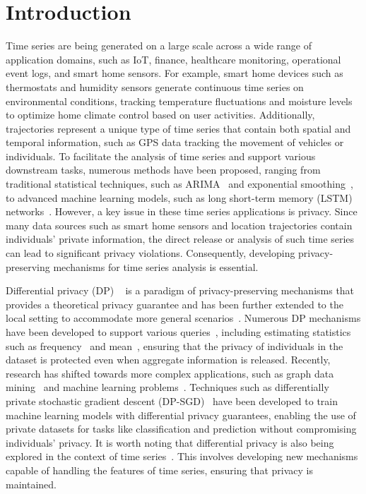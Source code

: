 \section{Introduction}
Time series are being generated on a large scale across a wide range of application domains, such as IoT, finance, healthcare monitoring, operational event logs, and smart home sensors. For example, smart home devices such as thermostats and humidity sensors generate continuous time series on environmental conditions, tracking temperature fluctuations and moisture levels to optimize home climate control based on user activities. Additionally, trajectories represent a unique type of time series that contain both spatial and temporal information, such as GPS data tracking the movement of vehicles or individuals. To facilitate the analysis of time series and support various downstream tasks,  numerous methods have been proposed, ranging from traditional statistical techniques, such as ARIMA~\cite{hyndman2018forecasting} and exponential smoothing~\cite{gardner2006exponential}, to advanced machine learning models, such as long short-term memory (LSTM) networks~\cite{shi2015convolutional}. However, a key issue in these time series applications is privacy. Since many data sources such as smart home sensors and location trajectories contain individuals' private information, the direct release or analysis of such time series can lead to significant privacy violations. Consequently, developing privacy-preserving mechanisms for time series analysis is essential.

Differential privacy (DP) ~\cite{Dwork2006} is a paradigm of privacy-preserving mechanisms that provides a theoretical privacy guarantee and has been further extended to the local setting to accommodate more general scenarios~\cite{ye2020local, Yang2023}. Numerous DP mechanisms have been developed to support various queries~\cite{wang2017locally, wang2018privacy, wang2019locallyhv}, including estimating statistics such as frequency~\cite{wang2017locally, fu2023collecting} and mean~\cite{li2020estimating}, ensuring that the privacy of individuals in the dataset is protected even when aggregate information is released. Recently, research has shifted towards more complex applications, such as graph data mining~\cite{ye2020towards} and machine learning problems~\cite{zhang2012functional}. Techniques such as differentially private stochastic gradient descent (DP-SGD)~\cite{abadi2016deep, fu2023dpsur} have been developed to train machine learning models with differential privacy guarantees, enabling the use of private datasets for tasks like classification and prediction without compromising individuals' privacy. It is worth noting that differential privacy is also being explored in the context of time series~\cite{dwork2010differential, chan2011private, Kellaris14}. This involves developing new mechanisms capable of handling the features of time series, ensuring that privacy is maintained.

